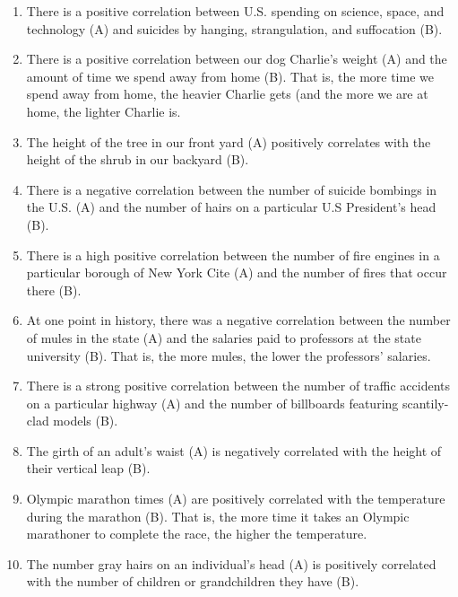 \begin{enumerate}
\item There is a positive correlation between U.S. spending on science,
space, and technology (A) and suicides by hanging, strangulation, and
suffocation (B).
\item There is a positive correlation between our dog Charlie's weight (A)
and the amount of time we spend away from home (B). That is, the
more time we spend away from home, the heavier Charlie gets (and
the more we are at home, the lighter Charlie is.
\item The height of the tree in our front yard (A) positively correlates with
the height of the shrub in our backyard (B).
\item There is a negative correlation between the number of suicide
bombings in the U.S. (A) and the number of hairs on a particular U.S
President's head (B).
\item There is a high positive correlation between the number of fire
engines in a particular borough of New York Cite (A) and the number
of fires that occur there (B).
\item At one point in history, there was a negative correlation between the
number of mules in the state (A) and the salaries paid to professors at
the state university (B). That is, the more mules, the lower the
professors' salaries.
\item There is a strong positive correlation between the number of traffic
accidents on a particular highway (A) and the number of billboards
featuring scantily-clad models (B).
\item The girth of an adult's waist (A) is negatively correlated with the height
of their vertical leap (B).
\item Olympic marathon times (A) are positively correlated with the
temperature during the marathon (B). That is, the more time it takes
an Olympic marathoner to complete the race, the higher the
temperature.
\item The number gray hairs on an individual's head (A) is positively
correlated with the number of children or grandchildren they have (B).
\end{enumerate}
